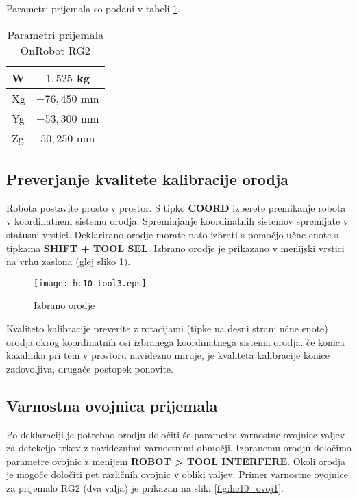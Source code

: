 Parametri prijemala so podani v tabeli  \ref{tab:rg3}.
\begin{table}
	\centering
	\caption{Parametri prijemala OnRobot RG2} \label{tab:rg3}
	\begin{tabular}{|l|c|}
		\hline W    & $1,525$ kg \\
		\hline Xg   & $-76,450$ mm \\
		\hline Yg   & $-53,300$ mm \\
		\hline Zg   & $50,250$ mm \\
		\hline
	\end{tabular}
\end{table}

\subsection*{Preverjanje kvalitete kalibracije orodja}

Robota postavite prosto v prostor. S tipko \textbf{COORD} izberete premikanje robota v koordinatnem sistemu orodja. Spreminjanje koordinatnih
sistemov spremljate v statusni vrstici. Deklarirano orodje morate nato izbrati s pomočjo učne enote s tipkama\textbf{ SHIFT + TOOL SEL}. Izbrano orodje je prikazano v menijski vrstici na vrhu zaslona (glej sliko \ref{fig:hc10_tool3}).

\begin{figure}[!hbt]
	\centering
	\texttt{[image: hc10\_tool3.eps]}
	\caption{Izbrano orodje}
	\label{fig:hc10_tool3}
\end{figure}

Kvaliteto kalibracije preverite z rotacijami (tipke na desni strani učne enote) orodja okrog koordinatnih osi izbranega koordinatnega sistema orodja. če konica kazalnika pri tem v prostoru navidezno miruje, je kvaliteta kalibracije konice zadovoljiva, drugače postopek ponovite.

\subsection*{Varnostna ovojnica prijemala}

Po deklaraciji je potrebno orodju določiti še parametre varnostne ovojnice valjev za detekcijo trkov z navideznimi varnostnimi območji. Izbranemu orodju določimo parametre ovojnic z menijem \textbf{ROBOT > TOOL INTERFERE}. Okoli orodja je mogoče določiti pet različnih ovojnic v obliki valjev. Primer varnostne ovojnice za prijemalo RG2 (dva valja) je prikazan na sliki \ref{fig:hc10_ovoj1}.

